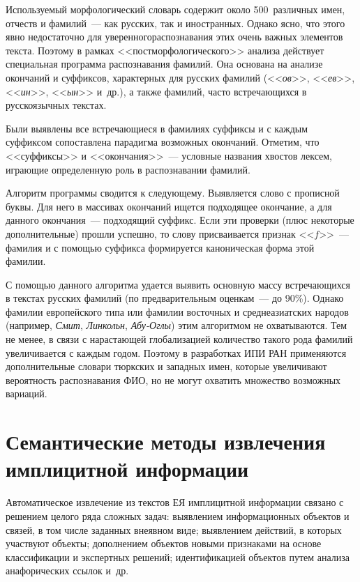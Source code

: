 \begin{multicols}{2}
     Используемый морфологический словарь содержит около 500~различных 
имен, отчеств и фамилий~--- как русских, так и иностранных. Однако ясно, что 
этого явно недостаточно для уверенного\linebreak распознавания этих очень важных 
элементов текс\-та. Поэтому в рамках <<постморфологического>> анализа 
действует специальная программа распознавания фамилий. Она основана на 
анализе окончаний и суффиксов, характерных для русских фамилий 
(<<\textit{ов}>>, <<\textit{ев}>>, <<\textit{ин}>>, <<\textit{ын}>> и~др.), а также 
фамилий, часто встречающихся в русскоязычных текстах.
     
     Были выявлены все встречающиеся в фамилиях суффиксы и с каждым 
суффиксом сопоставлена парадигма возможных окончаний. Отметим, что 
<<суффиксы>> и <<окончания>>~--- услов\-ные названия хвостов лексем, 
играющие определенную роль в распознавании фамилий.
     
     Алгоритм программы сводится к следующему. Выявляется слово с 
прописной буквы. Для него в массивах окончаний ищется подходящее 
окончание, а для данного окончания~--- подходящий суффикс. Если эти 
проверки (плюс некоторые дополнительные) прошли успешно, то слову 
присваивается признак <<$f$>>~--- фамилия и с помощью суффикса 
формируется каноническая форма этой фамилии. 
     
     С помощью данного алгоритма удается выявить основную массу 
встречающихся в текстах русских фамилий (по предварительным оценкам~--- 
до 90\%). Однако фамилии европейского типа или фамилии восточных и 
среднеазиатских народов (например, \textit{Смит}, \textit{Линкольн}, 
\textit{Абу-Оглы}) этим алгоритмом не охватываются. Тем не менее, в связи с 
на\-рас\-та\-ющей глобализацией количество такого рода фамилий увеличивается с 
каждым годом. Поэтому в разработках ИПИ РАН применяются 
дополнительные словари тюркских и западных имен, которые 
увеличивают вероятность распознавания ФИО, но не могут охватить множество 
возможных вариаций.

\vspace*{-6pt}

\section{Семантические методы извлечения имплицитной 
информации}
     
     Автоматическое извлечение из текстов ЕЯ имплицитной информации 
связано с решением целого ряда сложных задач: выявлением информационных 
объектов и связей, в том числе заданных в\linebreak \mbox{неявном} виде; выявлением действий, 
в которых участвуют объекты; дополнением объектов новыми признаками на 
основе классификации и экспертных решений; идентификацией объектов путем 
анализа анафорических ссылок и~др. 


\end{multicols}
